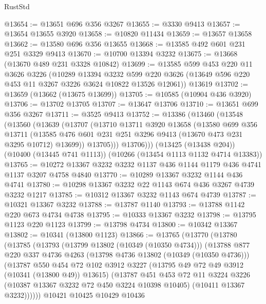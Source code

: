 \begin{lexlean}{RustStd}
\begin{coremodule}
{\begin{coremodule}
{{{{{{{{{{{{{{{{{{{{{{{{{@13654 := @13651 @696 @356 @3267
@13655 := @3330 @9413
@13657 := @13654 @13655 @3920
@13658 := @10820 @11434
@13659 := @13657 @13658
@13662 := @13580 @696 @356 @13655
@13668 := @13585 @492 @601 @231 @251 @3329 @9413
@13670 := @10700 @13394 @3232
@13675 := @13668 (@13670 @489 @231 @3328 @10842)
@13699 := @13585
    @599
    @453
    @220
    @11
    @3626
    @3226
    (@10289
      @13394
      @3232
      @599
      @220
      @3626
      (@13649 @596 @220 @453 @11 @3267 @3226 @3624 @10822 @13526 @12061))
    @13619
@13702 := @13659 (@13662 (@13675 @13699))
@13705 := @10585 (@10904 @436 @3920)
@13706 := @13702 @13705
@13707 := @13647 @13706
@13710 := @13651 @699 @356 @3267
@13711 := @3525 @9413
@13752 := @13386
    (@13460
      (@13548
        (@13560
          (@13639
            (@13707
              (@13710
                @13711
                @3920
                @13658
                (@13580
                  @699
                  @356
                  @13711
                  (@13585 @476 @601 @231 @251 @3296 @9413 (@13670 @473 @231 @3295 @10712) @13699))
                @13705)))
          @13706)))
    (@13425 (@13438 @204))
    (@10400 (@13445 @741 @1113))
    (@10266 (@13454 @1113 @1132 @4714 @13383))
@13765 := @10272 @13367 @3232 @3232 @1137 @436 @1144 @1179 @436 @4741 @1137 @3207 @4758 @4840
@13770 := @10289 @13367 @3232 @1144 @436 @4741
@13780 := @10298 @13367 @3232 @22 @1143 @674 @436 @3267 @4739 @3232 @1217
@13785 := @10312 @13367 @3232 @1143 @674 @4739
@13787 := @10321 @13367 @3232
@13788 := @13787 @1140
@13793 := @13788 @1142 @220 @673 @4734 @4738
@13795 := @10333 @13367 @3232
@13798 := @13795 @1123 @220 @1123
@13799 := @13798 @4734
@13800 := @10342 @13367
@13802 := @10341 (@13800 @1123)
@13866 := @13765
    (@13770
      (@13780
        (@13785
          (@13793
            (@13799 @13802 (@10349 (@10350 @4734)))
            (@13788
              @877
              @220
              @337
              @4736
              @4263
              (@13798 @4736 @13802 (@10349 (@10350 @4736)))
              (@13787
                @550
                @454
                @72
                @102
                @3912
                @3227
                (@13795 @49 @72 @49 @3912 (@10341 (@13800 @49)) @13615)
                (@13787
                  @451
                  @453
                  @72
                  @11
                  @3224
                  @3226
                  (@10387 @13367 @3232 @72 @450 @3224 @10398 @10405)
                  (@10411 @13367 @3232))))))
        @10421
        @10425
        @10429
        @10436
}}}}}}}}}}}}}}}}}}}}}}}}}
\end{coremodule}}
\end{coremodule}
\end{lexlean}
